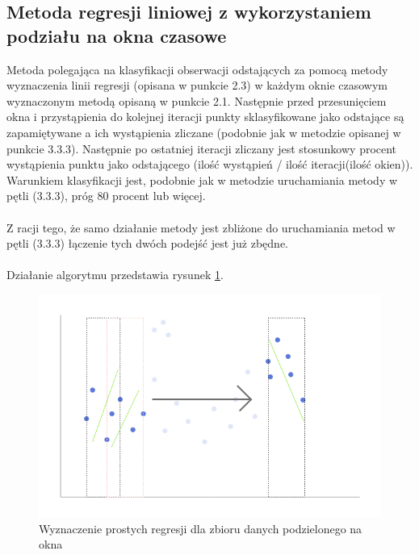 \documentclass[eng,printmode]{mgr}
\begin{document}
\subsection{Metoda regresji liniowej z wykorzystaniem podziału na okna czasowe}
Metoda polegająca na klasyfikacji obserwacji odstających za pomocą metody wyznaczenia linii regresji (opisana w punkcie 2.3) w każdym oknie czasowym wyznaczonym metodą opisaną w punkcie 2.1. Następnie przed przesunięciem okna i przystąpienia do kolejnej iteracji punkty sklasyfikowane jako odstające są zapamiętywane a ich wystąpienia zliczane (podobnie jak w metodzie opisanej w punkcie 3.3.3). Następnie po ostatniej iteracji zliczany jest stosunkowy procent wystąpienia punktu jako odstającego (ilość wystąpień / ilość iteracji(ilość okien)). Warunkiem klasyfikacji jest, podobnie jak w metodzie uruchamiania metody w pętli (3.3.3), próg 80 procent lub więcej. \\\\
Z racji tego, że samo działanie metody jest zbliżone do uruchamiania metod w pętli (3.3.3) łączenie tych dwóch podejść jest już zbędne.
\\\\
Działanie algorytmu przedstawia rysunek \ref{fig:reg_windowed}.
\begin{figure}[H]
  \begin{center}
  \includegraphics[scale=0.7]{reg_windowed}
  \end{center}
  \caption{Wyznaczenie prostych regresji dla zbioru danych podzielonego na okna}
  \label{fig:reg_windowed}
\end{figure}
\end{document}
